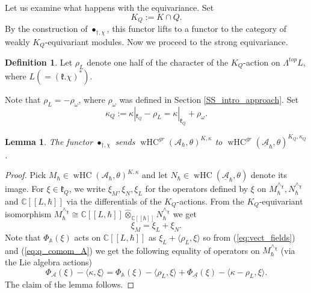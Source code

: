 \documentclass[12pt]{amsart}
\newcommand{\C}{\mathbb{C}}
\newcommand{\A}{\mathcal{A}}
\newcommand{\kf}{\mathfrak{k}}
\newcommand{\HC}{\operatorname{HC}}
\newcommand{\wHC}{\operatorname{wHC}}
\newcommand{\Weyl}{\mathbb{A}}
\newtheorem{Lem}[Thm]{Lemma}
\theoremstyle{definition}
\newtheorem{defi}[Thm]{Definition}
\numberwithin{equation}{section}
\begin{document}

Let us examine what happens with the equivariance. Set
\begin{equation}\label{eq:K_Q_def}
K_Q:=K\cap Q.
\end{equation}
By the  construction of $\bullet_{\dagger,\chi}$, this functor lifts to a functor to the category
of weakly $K_Q$-equivariant modules. Now we proceed to the strong equivariance.

\begin{defi}\label{defi:half_character}
Let $\rho_L$ denote one half of the character of the
$K_Q$-action on $\Lambda^{top}L$, where $L(=(\kf.\chi)^*)$.
\end{defi}

Note that $\rho_L=-\rho_\omega$, where $\rho_\omega$ was defined in Section \ref{SS_intro_approach}.
Set
\begin{equation}\label{eq:shifted_character}
\kappa_Q:=\kappa|_{\kf_Q}-\rho_L = \kappa|_{\kf_Q} + \rho_\omega.
\end{equation}

\begin{Lem}\label{Lem:restriction_equivariance}
The functor $\bullet_{\dagger,\chi}$ sends
$\wHC^{gr}(\A_\hbar,\theta)^{K,\kappa}$ to
$\wHC^{gr}(\underline{\A}_\hbar,\theta)^{K_Q,\kappa_Q}$.
\end{Lem}
\begin{proof}
Pick $M_\hbar\in  \wHC(\A_\hbar,\theta)^{K,\kappa}$ and let $ N_\hbar\in \wHC(\underline{\A}_\hbar, \theta)$ denote its image. For $\xi\in \kf_Q$, we write
$\xi_M,\xi_N,\xi_L$ for the operators defined by $\xi$ on $M_\hbar^{\wedge_\chi},
N_\hbar^{\wedge_\chi}$ and $\C[[L,\hbar]]$ via the differentials of the $K_Q$-actions. From the $K_Q$-equivariant isomorphism
$M_{\hbar}^{\wedge_\chi}\cong \C[[L,\hbar]]\widehat{\otimes}_{\C[[\hbar]]}N_\hbar^{\wedge_\chi}$
we get
\begin{equation}\label{eq:vect_fields}
\xi_{M}=\xi_L+\xi_N.
\end{equation}
Note that $\Phi_{\Weyl}(\xi)$ acts on $\C[[L,\hbar]]$ as $\xi_L+\langle\rho_L,\xi\rangle$
so from (\ref{eq:vect_fields}) and (\ref{eq:q_comom_A}) we get the following equality of
operators on $M_\hbar^{\wedge_\chi}$ (via the Lie algebra actions)
$$\Phi_{\A}(\xi)-\langle\kappa,\xi\rangle=\Phi_\Weyl(\xi)-\langle\rho_L,\xi\rangle+
\Phi_{\underline{\A}}(\xi)-\langle\kappa-\rho_L,\xi\rangle.$$
The claim of the lemma follows.
\end{proof}
\end{document}
